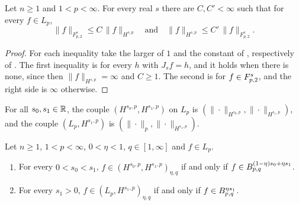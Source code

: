 \begin{lemma}
\label{lem:bessel-potential-norm-tl}
\leanok
{}
Let $n \geq 1$ and $1 < p < \infty$. For every real $s$ there are $C, C' < \infty$ such that for
every $f \in L_p$,
\[
  \|f\|_{F^s_{p,2}} \leq C \, \|f\|_{H^{s,p}}
  \quad \text{and} \quad
  \|f\|_{H^{s,p}} \leq C' \, \|f\|_{F^s_{p,2}} .
\]
\end{lemma}

\begin{proof}
\leanok
For each inequality take the larger of $1$ and the constant of
, respectively of
. The first inequality is
 for every $h$ with $J_s f = h$, and it holds when there
is none, since then $\|f\|_{H^{s,p}} = \infty$ and $C \geq 1$. The second is
 for $f \in F^{s}_{p,2}$, and the right side is $\infty$
otherwise.
\end{proof}

\begin{definition}
\label{def:bessel-potential-couples}
\leanok
{}
For all $s_0, s_1 \in \mathbb{R}$, the couple $(H^{s_0,p}, H^{s_1,p})$ on $L_p$ is
$(\|\cdot\|_{H^{s_0,p}}, \|\cdot\|_{H^{s_1,p}})$, and the couple $(L_p, H^{s_1,p})$ is
$(\|\cdot\|_p, \|\cdot\|_{H^{s_1,p}})$.
\end{definition}

\begin{theorem}
\label{thm:bessel-potential-interpolate}
\leanok
{}
Let $n \geq 1$, $1 < p < \infty$, $0 < \eta < 1$, $q \in [1, \infty]$ and $f \in L_p$.
\begin{enumerate}
  \item For every $0 < s_0 < s_1$, $f \in (H^{s_0,p}, H^{s_1,p})_{\eta, q}$ if and only if
    $f \in B^{(1 - \eta) s_0 + \eta s_1}_{p,q}$.
  \item For every $s_1 > 0$, $f \in (L_p, H^{s_1,p})_{\eta, q}$ if and only if
    $f \in B^{\eta s_1}_{p,q}$.
\end{enumerate}
\end{theorem}

